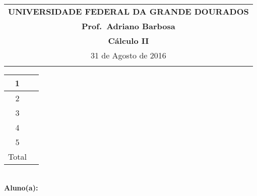 \documentclass[a4paper,5pt]{amsbook}
\begin{document}
\thispagestyle{empty}
\begin{minipage}[b]{0.45\linewidth}
\begin{tabular}{c}
\toprule{}
{{\bf UNIVERSIDADE FEDERAL DA GRANDE DOURADOS}}\\
{{\bf Prof.\ Adriano Barbosa}}\\



{{\bf C\'alculo II}}\\

\midrule{}
\hspace{8cm}31 de Agosto de 2016  \\
\bottomrule{}
\end{tabular}
%
\end{minipage} \hfill
\begin{minipage}[b]{0.58\linewidth}
\begin{flushright}
\def\arraystretch{1.2}
\begin{tabular}{|c|c|}
\hline\hline
1 & \hspace{1.2cm} \\
\hline
2& \\
\hline
3& \\
\hline
4&  \\
\hline
5&  \\
\hline
{\small Total}&  \\
\hline\hline
\end{tabular}
\end{flushright}
\end{minipage} \hfill
\vspace{0.3cm}\\
{\bf Aluno(a):}\dotfill{} \\
\end{document}
